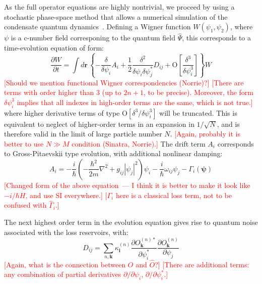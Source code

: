 \documentclass[aps,prl,twocolumn,showpacs,amsmath,amssymb,superscriptaddress]{revtex4-1}
\newcommand{\remark}[1]{\textcolor{red}{{[}#1{]}}}
\begin{document}
{As the full operator equations are highly nontrivial,
we proceed by using a stochastic phase-space method
that allows a numerical simulation of the condensate quantum dynamics~\cite{Drummond1993, Steel1998}.
Defining a Wigner function $W\left(\psi_{1},\psi_{2}\right)$,
where $\psi$ is a c-number field corresponing to the quantum field $\hat{\Psi}$,
this corresponds to a time-evolution equation of form:
\begin{equation}
	\frac{\partial W}{\partial t} = \int d\mathbf{r}\,\left\{
		-\frac{\delta}{\delta\psi_{i}} A_{i} +
		\frac{1}{2} \frac{\delta^{2}}{\delta\psi_{i} \delta\psi_{j}^{*}}D_{ij} +
		\mbox{O} \left[ \frac{\delta^{3}}{\delta\psi_{i}^{3}} \right]
	\right\} W
\end{equation}
	\remark{Should we mention functional Wigner correspondencies (Norrie)?}
	\remark{There are terms with order higher than 3 (up to $2n + 1$, to be precise).
	Moreover, the form $\delta\psi_{i}^{3}$ implies that all indexes in high-order terms
	are the same, which is not true.}
where higher derivative terms of type $\mbox{O}\left[\delta^{3}/\delta\psi_{i}^{3}\right]$
will be truncated.
This is equivalent to neglect of higher-order terms in an expansion in $1/\sqrt{N}$,
and is therefore valid in the limit of large particle number $N$.
	\remark{Again, probably it is better to use $N \gg M$ condition (Sinatra, Norrie).}
The drift term $A_{i}$ corresponds to Gross-Pitaevskii type evolution,
with additional nonlinear damping:
\begin{equation}
	A_{i} = -\frac{i}{\hbar} \left(
	 	-\frac{\hbar^2}{2m} \nabla^{2} + g_{ij} \left| \psi_{j} \right|^{2}
	\right) \psi_{i} -
	\frac{i}{\hbar} \omega_{ij} \psi_{j} -
	\Gamma_{i} \left( \boldsymbol{\psi} \right)
\end{equation}
	\remark{Changed form of the above equation~---
	I think it is better to make it look like $-i/\hbar H$, and use SI everywhere.}
	\remark{$\Gamma_{i}$ here is a classical loss term,
	not to be confused with $\hat{\Gamma}_{i}$.}

The next highest order term in the evolution equation gives rise to
quantum noise associated with the loss reservoirs,
with:
\begin{equation}
	D_{ij} = \sum_{n,\mathbf{k}} \kappa_{\mathbf{i}}^{(n)}
	\frac{\partial O_{\mathbf{k}}^{(n)*}}{\partial\psi_{i}^{*}}
	\frac{\partial O_{\mathbf{k}}^{(n)}}{\partial\psi_{j}}
\end{equation}
	\remark{Again, what is the connection between $O$ and $\hat{O}$?}
	\remark{There are additional terms: any combination of partial derivatives
	$\partial/\partial\psi_{i}$, $\partial/\partial\psi_{i}^*$.}

}
\end{document}
